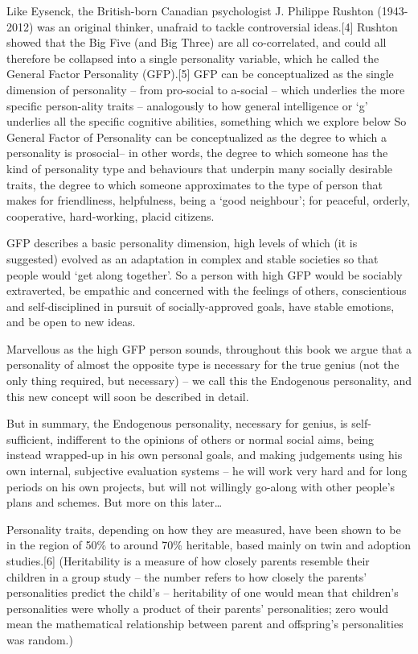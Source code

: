 \documentclass[
]{book}
\begin{document}
Like Eysenck, the British-born Canadian psychologist J. Philippe Rushton (1943-2012) was an original thinker, unafraid to tackle controversial ideas.{[}4{]} Rushton showed that the Big Five (and Big Three) are all co-correlated, and could all therefore be collapsed into a single personality variable, which he called the General Factor Personality (GFP).{[}5{]} GFP can be conceptualized as the single dimension of personality -- from pro-social to a-social -- which underlies the more specific person-ality traits -- analogously to how general intelligence or `g' underlies all the specific cognitive abilities, something which we explore below
So General Factor of Personality can be conceptualized as the degree to which a personality is prosocial-- in other words, the degree to which someone has the kind of personality type and behaviours that underpin many socially desirable traits, the degree to which someone approximates to the type of person that makes for friendliness, helpfulness, being a `good neighbour'; for peaceful, orderly, cooperative, hard-working, placid citizens.

GFP describes a basic personality dimension, high levels of which (it is suggested) evolved as an adaptation in complex and stable societies so that people would `get along together'. So a person with high GFP would be sociably extraverted, be empathic and concerned with the feelings of others, conscientious and self-disciplined in pursuit of socially-approved goals, have stable emotions, and be open to new ideas.

Marvellous as the high GFP person sounds, throughout this book we argue that a personality of almost the opposite type is necessary for the true genius (not the only thing required, but necessary) -- we call this the Endogenous personality, and this new concept will soon be described in detail.

But in summary, the Endogenous personality, necessary for genius, is self-sufficient, indifferent to the opinions of others or normal social aims, being instead wrapped-up in his own personal goals, and making judgements using his own internal, subjective evaluation systems -- he will work very hard and for long periods on his own projects, but will not willingly go-along with other people's plans and schemes. But more on this later\ldots{}

Personality traits, depending on how they are measured, have been shown to be in the region of 50\% to around 70\% heritable, based mainly on twin and adoption studies.{[}6{]} (Heritability is a measure of how closely parents resemble their children in a group study -- the number refers to how closely the parents' personalities predict the child's -- heritability of one would mean that children's personalities were wholly a product of their parents' personalities; zero would mean the mathematical relationship between parent and offspring's personalities was random.)
\end{document}
